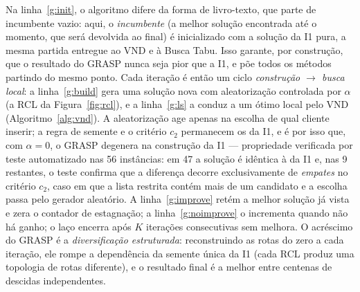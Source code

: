 \documentclass[12pt, a4paper]{article}
\begin{document}
 Na linha~\ref{g:init}, o algoritmo difere da forma de livro-texto, que parte de incumbente vazio: aqui, o \emph{incumbente} (a melhor solução encontrada até o momento, que será devolvida ao final) é inicializado com a solução da I1 pura, a mesma partida entregue ao VND e à Busca Tabu. Isso garante, por construção, que o resultado do GRASP nunca seja pior que a I1, e põe todos os métodos partindo do mesmo ponto. Cada iteração é então um ciclo \emph{construção $\rightarrow$ busca local}: a linha~\ref{g:build} gera uma solução nova com aleatorização controlada por $\alpha$ (a RCL da Figura~\ref{fig:rcl}), e a linha~\ref{g:ls} a conduz a um ótimo local pelo VND (Algoritmo~\ref{alg:vnd}). A aleatorização age apenas na escolha de qual cliente inserir; a regra de semente e o critério $c_2$ permanecem os da I1, e é por isso que, com $\alpha=0$, o GRASP degenera na construção da I1 --- propriedade verificada por teste automatizado nas 56 instâncias: em 47 a solução é idêntica à da I1 e, nas 9 restantes, o teste confirma que a diferença decorre exclusivamente de \emph{empates} no critério $c_2$, caso em que a lista restrita contém mais de um candidato e a escolha passa pelo gerador aleatório. A linha~\ref{g:improve} retém a melhor solução já vista e zera o contador de estagnação; a linha~\ref{g:noimprove} o incrementa quando não há ganho; o laço encerra após $K$ iterações consecutivas sem melhora. O acréscimo do GRASP é a \emph{diversificação estruturada}: reconstruindo as rotas do zero a cada iteração, ele rompe a dependência da semente única da I1 (cada RCL produz uma topologia de rotas diferente), e o resultado final é a melhor entre centenas de descidas independentes.
\end{document}
